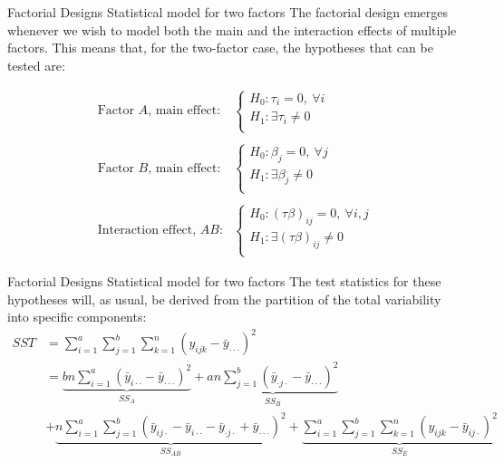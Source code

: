 \documentclass[t]{beamer}
\begin{document}
\begin{ftst}
{Factorial Designs}
{Statistical model for two factors}
The factorial design emerges whenever we wish to model both the main and the interaction effects of multiple factors. This means that, for the two-factor case, the hypotheses that can be tested are:

\begin{align*}
\mbox{Factor $A$, main effect:}&\begin{cases}
H_0: \tau_i = 0,\ \forall i\\
H_1: \exists\tau_i \neq 0\\
\end{cases}\\
& \\
\mbox{Factor $B$, main effect:}&\begin{cases}
H_0: \beta_j = 0,\ \forall j\\
H_1: \exists\beta_j \neq 0\\
\end{cases}\\
& \\
\mbox{Interaction effect, $AB$:}&\begin{cases}
H_0: (\tau\beta)_{ij} = 0,\ \forall i,j\\
H_1: \exists(\tau\beta)_{ij} \neq 0\\
\end{cases}
\end{align*}
\end{ftst}


\begin{ftst}
{Factorial Designs}
{Statistical model for two factors}
The test statistics for these hypotheses will, as usual, be derived from the partition of the total variability into specific components:
\begin{align*}
SST &= \sum\limits_{i=1}^{a}\sum\limits_{j=1}^{b}\sum\limits_{k=1}^{n}\left(y_{ijk} - \bar{y}_{\cdot\cdot\cdot}\right)^2\\
&= \underbrace{bn\sum\limits_{i=1}^{a}\left(\bar{y}_{i\cdot\cdot} - \bar{y}_{\cdot\cdot\cdot}\right)^2}_{SS_A} + \underbrace{an\sum\limits_{j=1}^{b}\left(\bar{y}_{\cdot j\cdot} - \bar{y}_{\cdot\cdot\cdot}\right)^2}_{SS_B}\\
&+\underbrace{n\sum\limits_{i=1}^{a}\sum\limits_{j=1}^{b}\left(\bar{y}_{ij\cdot} -\bar{y}_{i\cdot\cdot}-\bar{y}_{\cdot j\cdot}+ \bar{y}_{\cdot\cdot\cdot}\right)^2}_{SS_{AB}} + \underbrace{\sum\limits_{i=1}^{a}\sum\limits_{j=1}^{b}\sum\limits_{k=1}^{n}\left(y_{ijk} - \bar{y}_{ij\cdot}\right)^2}_{SS_E}
\end{align*}
\end{ftst}
\end{document}

